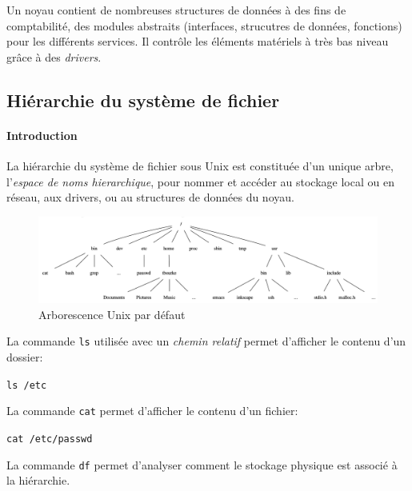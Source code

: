 \documentclass[french, toc]{../cs-classes/cs-classes}
\begin{document}
Un noyau contient de nombreuses structures de données à des fins de comptabilité, des modules abstraits (interfaces, strucutres de données, fonctions) pour les différents services. Il contrôle les éléments matériels à très bas niveau grâce à des \emph{drivers}. 

\subsection{Hiérarchie du système de fichier}
\paragraph{Introduction} La hiérarchie du système de fichier sous Unix est constituée d'un unique arbre, l'\emph{espace de noms hierarchique}, pour nommer et accéder au stockage local ou en réseau, aux drivers, ou au structures de données du noyau.
\begin{figure}[!ht]
    \centering
    \includegraphics[scale=0.35]{unix-tree.png}
    \caption{Arborescence Unix par défaut}
\end{figure}

La commande \texttt{ls} utilisée avec un \emph{chemin relatif} permet d'afficher le contenu d'un dossier:
\begin{center}
    \texttt{ls /etc}
\end{center}

La commande \texttt{cat} permet d'afficher le contenu d'un fichier:
\begin{center}
    \texttt{cat /etc/passwd}
\end{center}

La commande \texttt{df} permet d'analyser comment le stockage physique est associé à la hiérarchie.
\end{document}
